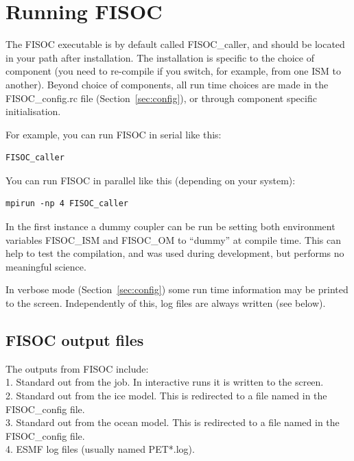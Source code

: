 \documentclass[12pt]{article}
\begin{document}









\section{Running FISOC}
\label{sec:FISOC_SUG}

The FISOC executable is by default called FISOC\_caller, and should be located in your 
path after installation. 
The installation is specific to the choice of component (you need to re-compile if you switch, for 
example, from one ISM to another).  
Beyond choice of components, all run time choices are made in the FISOC\_config.rc file
(Section~\ref{sec:config}), 
or through component specific initialisation.

For example, you can run FISOC in serial like this:
\begin{lstlisting}
FISOC_caller
\end{lstlisting}
You can run FISOC in parallel like this (depending on your system):
\begin{lstlisting}
mpirun -np 4 FISOC_caller
\end{lstlisting}

In the first instance a dummy coupler can be run be setting both environment variables FISOC\_ISM and 
FISOC\_OM to ``dummy'' at compile time.  This can help to test the compilation, and was used during development, 
but performs no meaningful science.  

In verbose mode (Section~\ref{sec:config}) some run time information may be printed to the screen.  
Independently of this, log files are always written (see below). 






\subsection{FISOC output files}


The outputs from FISOC include: \\
1. Standard out from the job.  In interactive runs it is written to the screen. \\
2. Standard out from the ice model.  This is redirected to a file named in the FISOC\_config file. \\
3. Standard out from the ocean model.  This is redirected to a file named in the FISOC\_config file. \\
4. ESMF log files (usually named PET*.log). 
\end{document}

